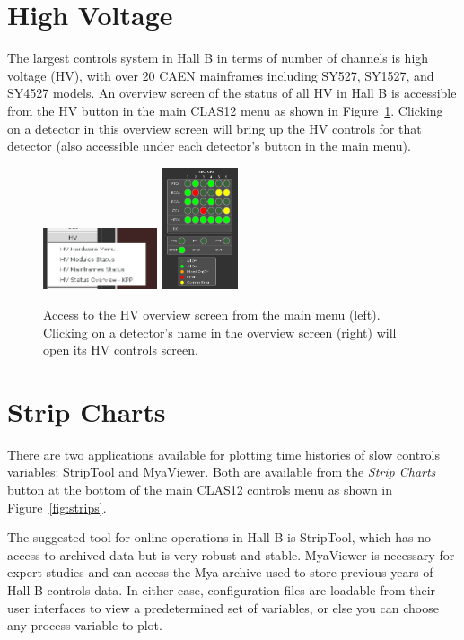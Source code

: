 \documentclass[amsmath,amssymb,notitlepage,11pt]{revtex4}
\begin{document}
\section{High Voltage}
The largest controls system in Hall B in terms of number of channels is high voltage (HV), with over 20 CAEN mainframes including SY527, SY1527, and SY4527 models.  An overview screen of the status of all HV in Hall B is accessible from the HV button in the main CLAS12 menu as shown in Figure~\ref{fig:hv}.  Clicking on a detector in this overview screen will bring up the HV controls for that detector (also accessible under each detector's button in the main menu).

\begin{figure}[htbp]\centering
  \includegraphics[width=0.3\textwidth]{pics/hvmenu}
  \includegraphics[width=0.2\textwidth]{pics/hvstat}
  \caption{Access to the HV overview screen from the main menu (left).  Clicking on a detector's name in the overview screen (right) will open its HV controls screen.\label{fig:hv}}
\end{figure}


\section{Strip Charts}
There are two applications available for plotting time histories of slow controls variables:  StripTool and MyaViewer.  Both are available from the {\em Strip Charts} button at the bottom of the main CLAS12 controls menu as shown in Figure~\ref{fig:strips}.

The suggested tool for online operations in Hall B is StripTool, which has no access to archived data but is very robust and stable.  MyaViewer is necessary for expert studies and can access the Mya archive used to store previous years of Hall B controls data.  In either case, configuration files are loadable from their user interfaces to view a predetermined set of variables, or else you can choose any process variable to plot.
\end{document}
